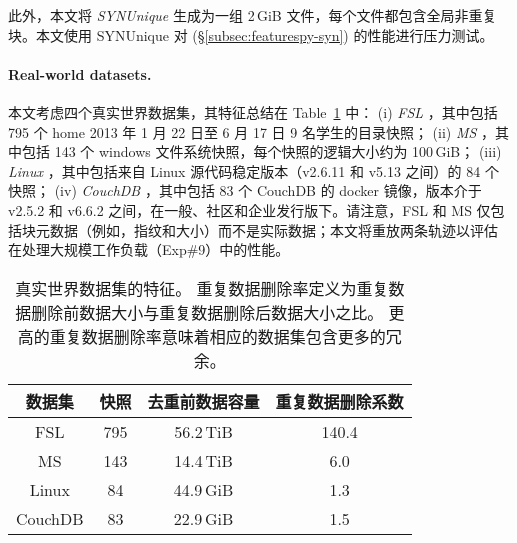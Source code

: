 此外，本文将 {\em SYNUnique} 生成为一组 2\,GiB 文件，每个文件都包含全局非重复块。本文使用 SYNUnique 对 \prototype (\S\ref{subsec:featurespy-syn}) 的性能进行压力测试。

\paragraph*{Real-world datasets.} 本文考虑四个真实世界数据集，其特征总结在 Table~\ref{tab:featurespy-datasets} 中： (i) {\em FSL} \cite{fsl}，其中包括 795 个 home 2013 年 1 月 22 日至 6 月 17 日 9 名学生的目录快照； (ii) {\em MS} \cite{meyer2011deduplication}，其中包括 143 个 windows 文件系统快照，每个快照的逻辑大小约为 100\,GiB； (iii) {\em Linux} \cite{linux}，其中包括来自 Linux 源代码稳定版本（v2.6.11 和 v5.13 之间）的 84 个快照； (iv) {\em CouchDB} \cite{couchdb}，其中包括 83 个 CouchDB 的 docker 镜像，版本介于 v2.5.2 和 v6.6.2 之间，在一般、社区和企业发行版下。请注意，FSL 和 MS 仅包括块元数据（例如，指纹和大小）而不是实际数据；本文将重放两条轨迹以评估 \prototype 在处理大规模工作负载（Exp\#9）中的性能。

\begin{table}
  \centering
  \small
  \begin{tabular}{cccc}
    \toprule
    {\bf 数据集} & {\bf 快照} & {\bf 去重前数据容量} & {\bf 重复数据删除系数} \\
    \midrule
    FSL & 795 & 56.2\,TiB & 140.4 \\
    MS & 143 & 14.4\,TiB & 6.0 \\
    Linux & 84 & 44.9\,GiB & 1.3 \\
    CouchDB & 83 & 22.9\,GiB & 1.5 \\
    \bottomrule
  \end{tabular}
  \caption{真实世界数据集的特征。 重复数据删除率定义为重复数据删除前数据大小与重复数据删除后数据大小之比。 更高的重复数据删除率意味着相应的数据集包含更多的冗余。}
  \vspace{-6pt}
  \label{tab:featurespy-datasets}
\end{table}
